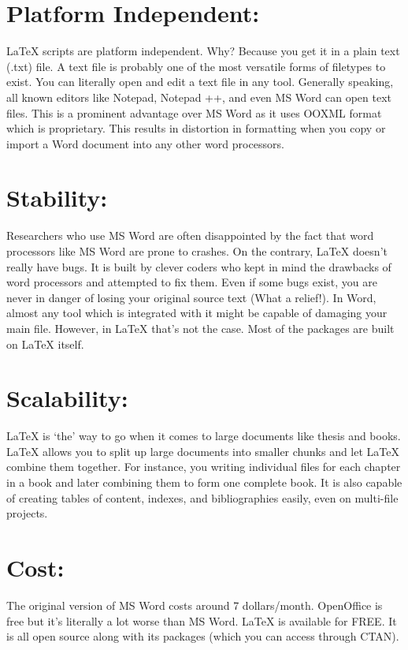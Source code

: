 \documentclass[12pt, document]{article}
\begin{document}
\chapter{\textbf{Platform Independent:}}
LaTeX scripts are platform independent. Why? Because you get it in a plain text (.txt) file. A text file is probably one of the most versatile forms of filetypes to exist. You can literally open and edit a text file in any tool. Generally speaking, all known editors like Notepad, Notepad ++, and even MS Word can open text files. This is a prominent advantage over MS Word as it uses OOXML format which is proprietary. This results in distortion in formatting when you copy or import a Word document into any other word processors.

\chapter{\textbf{Stability:}}
Researchers who use MS Word are often disappointed by the fact that word processors like MS Word are prone to crashes. On the contrary, LaTeX doesn’t really have bugs. It is built by clever coders who kept in mind the drawbacks of word processors and attempted to fix them. Even if some bugs exist, you are never in danger of losing your original source text (What a relief!). In Word, almost any tool which is integrated with it might be capable of damaging your main file. However, in LaTeX that’s not the case. Most of the packages are built on LaTeX itself.

\chapter{\textbf{Scalability:}}
LaTeX is ‘the’ way to go when it comes to large documents like thesis and books. LaTeX allows you to split up large documents into smaller chunks and let LaTeX combine them together. For instance, you writing individual files for each chapter in a book and later combining them to form one complete book. It is also capable of creating tables of content, indexes, and bibliographies easily, even on multi-file projects.

\chapter{\textbf{Cost:}}
The original version of MS Word costs around 7 dollars/month. OpenOffice is free but it’s literally a lot worse than MS Word. LaTeX is available for FREE. It is all open source along with its packages (which you can access through CTAN).
\thispagestyle{empty}
\end{document}

